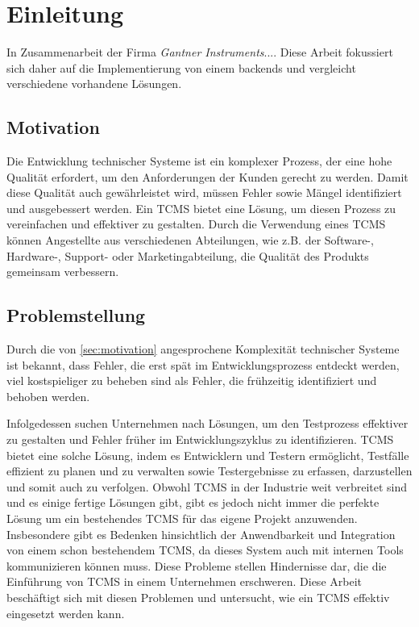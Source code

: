 \documentclass[a4paper, fontsize=11pt, parskip=half, twoside]{scrreprt}
\begin{document}
	\clearpage
	\chapter{Einleitung}
	In Zusammenarbeit der Firma \emph{Gantner Instruments}....  
	Diese Arbeit fokussiert sich daher auf die Implementierung von einem  backends und vergleicht verschiedene vorhandene Lösungen.
	
	\section{Motivation} \label{sec:motivation}
	Die Entwicklung technischer Systeme ist ein komplexer Prozess, der eine hohe Qualität erfordert, um den Anforderungen der Kunden gerecht zu werden. 
	Damit diese Qualität auch gewährleistet wird, müssen Fehler sowie Mängel identifiziert und ausgebessert werden. 
	Ein \ac{TCMS} bietet eine Lösung, um diesen Prozess zu vereinfachen und effektiver zu gestalten. 
	Durch die Verwendung eines \ac{TCMS} können Angestellte aus verschiedenen Abteilungen, wie z.B. der Software-, Hardware-, Support- oder Marketingabteilung, die Qualität des Produkts gemeinsam verbessern. 
	
	\section{Problemstellung}
	Durch die von \autoref{sec:motivation} angesprochene Komplexität technischer Systeme ist bekannt, dass Fehler, die erst spät im Entwicklungsprozess entdeckt werden, viel kostspieliger zu beheben sind als Fehler, die frühzeitig identifiziert und behoben werden. 
	
	Infolgedessen suchen Unternehmen nach Lösungen, um den Testprozess effektiver zu gestalten und Fehler früher im Entwicklungszyklus zu identifizieren. 
	\ac{TCMS} bietet eine solche Lösung, indem es Entwicklern und Testern ermöglicht, Testfälle effizient zu planen und zu verwalten sowie Testergebnisse zu erfassen, darzustellen und somit auch zu verfolgen. 
	Obwohl \ac{TCMS} in der Industrie weit verbreitet sind und es einige fertige Lösungen gibt, gibt es jedoch nicht immer die perfekte Lösung um ein bestehendes \ac{TCMS} für das eigene Projekt anzuwenden. 
	Insbesondere gibt es Bedenken hinsichtlich der Anwendbarkeit und Integration von einem schon bestehendem \ac{TCMS}, da dieses System auch mit internen Tools kommunizieren können muss.
	Diese Probleme stellen Hindernisse dar, die die Einführung von \ac{TCMS} in einem Unternehmen erschweren. 
	Diese Arbeit beschäftigt sich mit diesen Problemen und untersucht, wie ein \ac{TCMS} effektiv eingesetzt werden kann.
	
\end{document}
